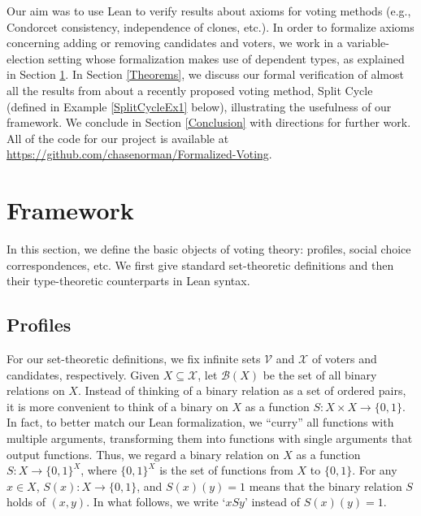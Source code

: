 \documentclass[runningheads]{llncs}
\begin{document}
Our aim was to use Lean to verify results about axioms for voting methods (e.g., Condorcet consistency, independence of clones, etc.). In order to formalize axioms concerning adding or removing candidates and voters, we work in a variable-election setting whose formalization makes use of dependent types, as explained in Section \ref{Framework}.  In Section \ref{Theorems}, we discuss our formal verification of almost all the results from \cite{HP2020} about a recently proposed voting method, Split Cycle (defined in Example \ref{SplitCycleEx1} below), illustrating the usefulness  of our  framework. We conclude in Section \ref{Conclusion} with directions for further work. All of the code for our project is available at \url{https://github.com/chasenorman/Formalized-Voting}.



 
\section{Framework}\label{Framework}

In this section, we define the basic objects of voting theory: profiles, social choice correspondences, etc. We first give standard set-theoretic definitions and then their type-theoretic counterparts in Lean syntax.

\subsection{Profiles}

For our set-theoretic definitions, we fix infinite sets $\mathcal{V}$ and $\mathcal{X}$ of voters and candidates, respectively. Given $X\subseteq\mathcal{X}$, let $\mathcal{B}(X)$ be the set of all binary relations on $X$. Instead of thinking of a binary relation as a set of ordered pairs, it is more convenient to think of a binary on $X$ as a function $S: X\times X \to \{0,1\}$. In fact, to better match our Lean formalization, we ``curry'' all functions with multiple arguments, transforming them into functions with single arguments that output functions. Thus, we regard a binary relation on $X$ as a function  $S:X\to \{0,1\}^X$, where $\{0,1\}^X$ is the set of functions from $X$ to $\{0,1\}$. For any $x\in X$, $S(x): X\to \{0,1\}$, and $S(x)(y)=1$ means that the binary relation $S$ holds of $(x,y)$. In what follows, we write `$xSy$' instead of $S(x)(y)=1$.

\end{document}
